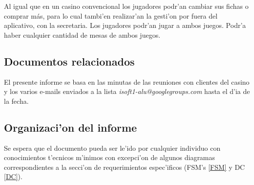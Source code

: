 Al igual que en un casino convencional los jugadores podr'an cambiar sus fichas o comprar más, para lo cual tambi'en realizar'an la gesti'on por fuera del aplicativo, con la secretaria.
Los jugadores podr'an jugar a ambos juegos. 
Podr'a haber cualquier cantidad de mesas de ambos juegos.


\subsection{ Documentos relacionados}
El presente informe se basa en las minutas de las reuniones con clientes del casino y los varios e-mails enviados a la lista \textit{isoft1-alu@googlegroups.com} hasta el d'ia de la fecha.


\subsection{ Organizaci'on del informe	}
Se espera que el documento pueda ser le'ido por cualquier individuo con conocimientos t'ecnicos m'inimos con excepci'on de algunos diagramas correspondientes a la secci'on de requerimientos espec'ificos (FSM's \ref{FSM} y DC \ref{DC}). 



